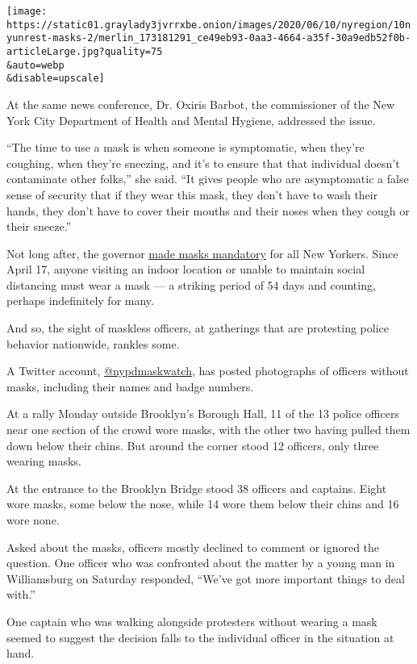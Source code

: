 \texttt{[image: https://static01.graylady3jvrrxbe.onion/images/2020/06/10/nyregion/10nyunrest-masks-2/merlin\_173181291\_ce49eb93-0aa3-4664-a35f-30a9edb52f0b-articleLarge.jpg?quality=75\\\&auto=webp\\\&disable=upscale]}

At the same news conference, Dr. Oxiris Barbot, the commissioner of the
New York City Department of Health and Mental Hygiene, addressed the
issue.

``The time to use a mask is when someone is symptomatic, when they're
coughing, when they're sneezing, and it's to ensure that that individual
doesn't contaminate other folks,'' she said. ``It gives people who are
asymptomatic a false sense of security that if they wear this mask, they
don't have to wash their hands, they don't have to cover their mouths
and their noses when they cough or their sneeze.''

Not long after, the governor
\href{https://www.nytimes3xbfgragh.onion/2020/04/17/nyregion/new-york-coronavirus-masks.html}{made
masks mandatory} for all New Yorkers. Since April 17, anyone visiting an
indoor location or unable to maintain social distancing must wear a mask
--- a striking period of 54 days and counting, perhaps indefinitely for
many.

And so, the sight of maskless officers, at gatherings that are
protesting police behavior nationwide, rankles some.

A Twitter account,
\href{https://twitter.com/nypdmaskwatch}{@nypdmaskwatch}, has posted
photographs of officers without masks, including their names and badge
numbers.

At a rally Monday outside Brooklyn's Borough Hall, 11 of the 13 police
officers near one section of the crowd wore masks, with the other two
having pulled them down below their chins. But around the corner stood
12 officers, only three wearing masks.

At the entrance to the Brooklyn Bridge stood 38 officers and captains.
Eight wore masks, some below the nose, while 14 wore them below their
chins and 16 wore none.

Asked about the masks, officers mostly declined to comment or ignored
the question. One officer who was confronted about the matter by a young
man in Williamsburg on Saturday responded, ``We've got more important
things to deal with.''

One captain who was walking alongside protesters without wearing a mask
seemed to suggest the decision falls to the individual officer in the
situation at hand.

